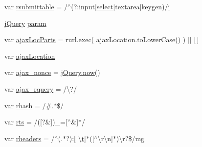 \begin{DoxyCompactItemize}
\item 
var \hyperlink{packages_2j_query_81_810_82_2_content_2_scripts_2jquery-1_810_82_8js_a12d248d7e6c5985c5ea21f56fbef9e90}{rsubmittable} = /$^\wedge$(?\+:input$\vert$\hyperlink{jquery-1_810_82-vsdoc_8js_a861f73402c6bb8457b04e4c36686ce8c}{select}$\vert$textarea$\vert$keygen)/\hyperlink{packages_2_respond_81_82_80_2content_2_scripts_2respond_8min_8js_a5e25b1d1bed9ab5f3174b76d6a722180}{i}
\item 
\hyperlink{packages_2j_query_81_810_82_2_content_2_scripts_2jquery-1_810_82_8js_a5e01048fbd3a30b44e8d491d8945c457}{j\+Query} \hyperlink{packages_2j_query_81_810_82_2_content_2_scripts_2jquery-1_810_82_8js_a24ced9cd3c9e1970a8cbe8d7adedc765}{param}
\item 
var \hyperlink{packages_2j_query_81_810_82_2_content_2_scripts_2jquery-1_810_82_8js_a4c35110da3c335cfca38505ee65a5e79}{ajax\+Loc\+Parts} = rurl.\+exec( ajax\+Location.\+to\+Lower\+Case() ) $\vert$$\vert$ \mbox{[}$\,$\mbox{]}
\item 
var \hyperlink{packages_2j_query_81_810_82_2_content_2_scripts_2jquery-1_810_82_8js_a1661d4e1676e7c6ffde5a3cb8d8ae246}{ajax\+Location}
\item 
var \hyperlink{packages_2j_query_81_810_82_2_content_2_scripts_2jquery-1_810_82_8js_aaa43e6d4c76ee8be878dd7e93fb755a4}{ajax\+\_\+nonce} = \hyperlink{jquery-1_810_82-vsdoc_8js_a1ecd248e0e501ce89712536174fdc6e3}{j\+Query.\+now}()
\item 
var \hyperlink{packages_2j_query_81_810_82_2_content_2_scripts_2jquery-1_810_82_8js_a4da85c0011217bf1643139dc23999c5c}{ajax\+\_\+rquery} = /\textbackslash{}?/
\item 
var \hyperlink{packages_2j_query_81_810_82_2_content_2_scripts_2jquery-1_810_82_8js_a6990b6955b6bec9dd39f3814cfb56d6d}{rhash} = /\#.$\ast$\$/
\item 
var \hyperlink{packages_2j_query_81_810_82_2_content_2_scripts_2jquery-1_810_82_8js_a38ff30904f54277281a13514d7aea00d}{rts} = /(\mbox{[}?\&\mbox{]})\+\_\+=\mbox{[}$^\wedge$\&\mbox{]}$\ast$/
\item 
var \hyperlink{packages_2j_query_81_810_82_2_content_2_scripts_2jquery-1_810_82_8js_af506d11612139f03091db71089d92e8b}{rheaders} = /$^\wedge$(.$\ast$?)\+:\mbox{[} \textbackslash{}\hyperlink{packages_2j_query_8_validation_81_811_81_2_content_2_scripts_2jquery_8validate_8min_8js_a23c5666e83bbbceee94adcd0851f50c4}{t}\mbox{]}$\ast$(\mbox{[}$^\wedge$\textbackslash{}r\textbackslash{}n\mbox{]}$\ast$)\textbackslash{}r?\$/mg
\item 
$$
\end{DoxyCompactItemize}
